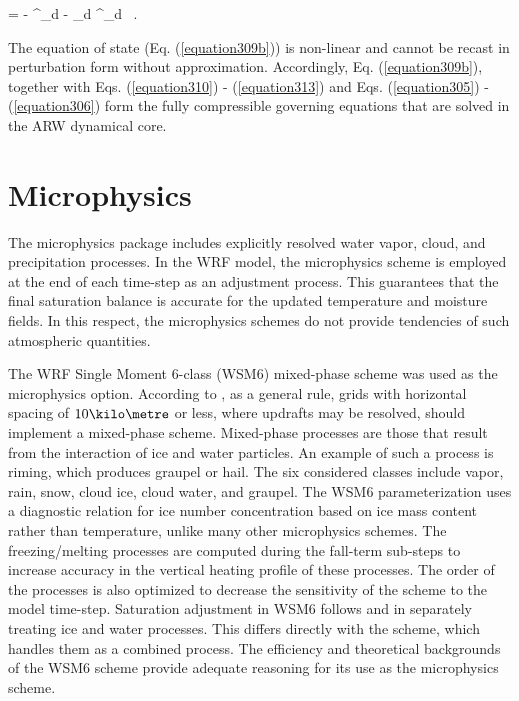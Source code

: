 \be
\pd{\phi^{\prime}}{\eta} = - \alpha^{\prime}_d - \alpha_d \mu^{\prime}_d \mbox{ .} \label{equation314}
\ee


The equation of state (Eq. (\autoref{equation309b})) is non-linear and cannot be recast in perturbation form without approximation. Accordingly, Eq. (\autoref{equation309b}), together with Eqs. (\autoref{equation310}) - (\autoref{equation313}) and Eqs. (\autoref{equation305}) - (\autoref{equation306}) form the fully compressible governing equations that are solved in the ARW dynamical core.

\section{Microphysics}
\label{mp-32}

The microphysics package includes explicitly resolved water vapor, cloud, and precipitation processes. In the WRF model, the microphysics scheme is employed at the end of each time-step as an adjustment process. This guarantees that the final saturation balance is accurate for the updated temperature and moisture fields. In this respect, the microphysics schemes do not provide tendencies of such atmospheric quantities.

The WRF Single Moment 6-class (WSM6) mixed-phase scheme was used as the microphysics option. According to  \citet{Skamarock}, as a general rule, grids with horizontal spacing of $10\kilo\metre$ or less, where updrafts may be resolved, should implement a mixed-phase scheme. Mixed-phase processes are those that result from the interaction of ice and water particles. An example of such a process is riming, which produces graupel or hail. The six considered classes include vapor, rain, snow, cloud ice, cloud water, and graupel. The WSM6 parameterization uses a diagnostic relation for ice number concentration based on ice mass content rather than temperature, unlike many other microphysics schemes. The freezing\slash melting processes are computed during the fall-term sub-steps to increase accuracy in the vertical heating profile of these processes. The order of the processes is also optimized to decrease the sensitivity of the scheme to the model time-step. Saturation adjustment in WSM6 follows  \citet{Dud89} and  \citet{Hong98} in separately treating ice and water processes. This differs directly with the \citet{Lin} scheme, which handles them as a combined process. The efficiency and theoretical backgrounds of the WSM6 scheme provide adequate reasoning for its use as the microphysics scheme.


